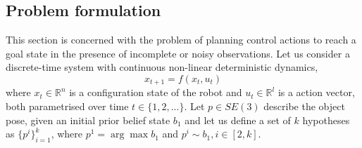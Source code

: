 \subsection{Problem formulation}
%

This section is concerned with the problem of planning control actions to reach a goal state in the presence of incomplete or noisy observations. Let us consider a discrete-time system with continuous non-linear deterministic dynamics, 
$$
x_{t+1}=f(x_t,u_t) 
$$ 
where $x_{t}\in\mathbb{R}^n$ is a configuration state of the robot and $u_{t}\in\mathbb{R}^l$ is a action vector, both parametrised over time $t\in\{1,2,...\}$.
Let $p\in SE(3)$ describe the object pose, given an initial prior belief state $b_1$ and let us define a set of $k$ hypotheses as $\{p^i\}_{i=1}^k$, where $p^1=\arg\max b_1$ and $p^i\sim b_1,i\in[2,k]$. 

